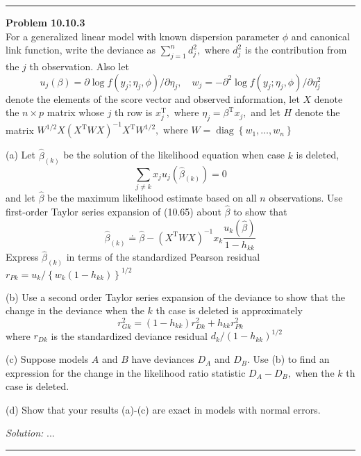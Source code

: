 \documentclass[a4paper, 11pt]{article}
\newenvironment{problem}[2][Problem]
    { \begin{mdframed}[backgroundcolor=gray!20] \textbf{#1 #2} \\}
    {  \end{mdframed}}
\newenvironment{solution}
    {\textit{Solution:}}
    {}
\begin{document}
\noindent\rule{7in}{2.8pt}
\begin{problem}{10.10.3}
For a generalized linear model with known dispersion parameter $\phi$ and canonical link function, write the deviance as $\sum_{j=1}^{n} d_{j}^{2},$ where $d_{j}^{2}$ is the contribution from the $j$ th observation. Also let
\[
u_{j}(\beta)=\partial \log f\left(y_{j} ; \eta_{j}, \phi\right) / \partial \eta_{j}, \quad w_{j}=-\partial^{2} \log f\left(y_{j} ; \eta_{j}, \phi\right) / \partial \eta_{j}^{2}
\]
denote the elements of the score vector and observed information, let $X$ denote the $n \times p$ matrix whose $j$ th row is $x_{j}^{\mathrm{T}},$ where $\eta_{j}=\beta^{\mathrm{T}} x_{j},$ and let $H$ denote the matrix
$
W^{1 / 2} X\left(X^{\mathrm{T}} W X\right)^{-1} X^{\mathrm{T}} W^{1 / 2}, \text { where } W=\operatorname{diag}\left\{w_{1}, \ldots, w_{n}\right\}
$

(a) Let $\widehat{\beta}_{(k)}$ be the solution of the likelihood equation when case $k$ is deleted,
\[
\sum_{j \neq k} x_{j} u_{j}\left(\widehat{\beta}_{(k)}\right)=0
\]
and let $\widehat{\beta}$ be the maximum likelihood estimate based on all $n$ observations. Use first-order Taylor series expansion of (10.65) about $\widehat{\beta}$ to show that
\[
\widehat{\beta}_{(k)} \doteq \widehat{\beta}-\left(X^{\mathrm{T}} W X\right)^{-1} x_{k} \frac{u_{k}(\widehat{\beta})}{1-h_{k k}}
\]
Express $\widehat{\beta}_{(k)}$ in terms of the standardized Pearson residual $r_{P k}=u_{k} /\left\{w_{k}\left(1-h_{k k}\right)\right\}^{1 / 2}$

(b) Use a second order Taylor series expansion of the deviance to show that the change in the deviance when the $k$ th case is deleted is approximately
\[
r_{G k}^{2}=\left(1-h_{k k}\right) r_{D k}^{2}+h_{k k} r_{P k}^{2}
\]
where $r_{D k}$ is the standardized deviance residual $d_{k} /\left(1-h_{k k}\right)^{1 / 2}$

(c) Suppose models $A$ and $B$ have deviances $D_{A}$ and $D_{B} .$ Use (b) to find an expression for the change in the likelihood ratio statistic $D_{A}-D_{B},$ when the $k$ th case is deleted.

(d) Show that your results (a)-(c) are exact in models with normal errors.
\end{problem}
\begin{solution}
...
\end{solution}

\noindent\rule{7in}{2.8pt}
\end{document}
